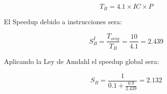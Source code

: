 \begin{equation}
T_{B} = 4.1 \times IC \times P
\end{equation}

El Speedup debido a instrucciones sera:

\begin{equation}
S^{I}_{B} = \frac{T_{orig}}{T_{B}} = \frac{10}{4.1} = 2.439
\end{equation}

Aplicando la Ley de Amdahl el speedup global sera:

\begin{equation}
S_{B} = \frac{1}{0.1 + \frac{0.9}{2.439}} = 2.132
\end{equation}

